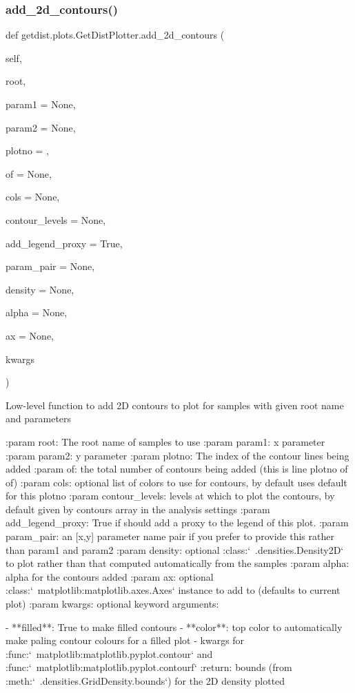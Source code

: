 \subsubsection{\texorpdfstring{add\+\_\+2d\+\_\+contours()}{add\_2d\_contours()}}
{\footnotesize\ttfamily def getdist.\+plots.\+Get\+Dist\+Plotter.\+add\+\_\+2d\+\_\+contours (\begin{DoxyParamCaption}\item[{}]{self,  }\item[{}]{root,  }\item[{}]{param1 = {\ttfamily None},  }\item[{}]{param2 = {\ttfamily None},  }\item[{}]{plotno = {},  }\item[{}]{of = {\ttfamily None},  }\item[{}]{cols = {\ttfamily None},  }\item[{}]{contour\+\_\+levels = {\ttfamily None},  }\item[{}]{add\+\_\+legend\+\_\+proxy = {\ttfamily True},  }\item[{}]{param\+\_\+pair = {\ttfamily None},  }\item[{}]{density = {\ttfamily None},  }\item[{}]{alpha = {\ttfamily None},  }\item[{}]{ax = {\ttfamily None},  }\item[{}]{kwargs }\end{DoxyParamCaption})}

\begin{DoxyVerb}Low-level function to add 2D contours to plot for samples with given root name and parameters

:param root: The root name of samples to use
:param param1: x parameter
:param param2: y parameter
:param plotno: The index of the contour lines being added
:param of: the total number of contours being added (this is line plotno of of)
:param cols: optional list of colors to use for contours, by default uses default for this plotno
:param contour_levels: levels at which to plot the contours, by default given by contours array in the analysis settings
:param add_legend_proxy: True if should add a proxy to the legend of this plot.
:param param_pair: an [x,y] parameter name pair if you prefer to provide this rather than param1 and param2
:param density: optional :class:`~.densities.Density2D` to plot rather than that computed automatically from the samples
:param alpha: alpha for the contours added
:param ax: optional :class:`~matplotlib:matplotlib.axes.Axes` instance to add to (defaults to current plot)
:param kwargs: optional keyword arguments:

       - **filled**: True to make filled contours
       - **color**: top color to automatically make paling contour colours for a filled plot
       - kwargs for :func:`~matplotlib:matplotlib.pyplot.contour` and :func:`~matplotlib:matplotlib.pyplot.contourf`
:return: bounds (from :meth:`~.densities.GridDensity.bounds`) for the 2D density plotted
\end{DoxyVerb}
 

